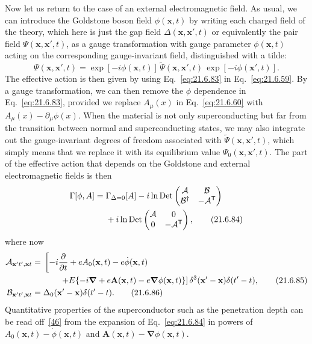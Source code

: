 Now let us return to the case of an external electromagnetic field. As usual, we can introduce the Goldstone boson field $\phi(\mathbf x,t)$ by writing each charged field of the theory, which here is just the gap field $\Delta(\mathbf x,\mathbf x',t)$ or equivalently the pair field $\Psi(\mathbf x,\mathbf x',t)$, as a gauge transformation with gauge parameter $\phi(\mathbf x,t)$ acting on the corresponding gauge-invariant field, distinguished with a tilde:
\begin{equation}
\Psi(\mathbf x,\mathbf x',t)
=\exp[-i\phi(\mathbf x,t)]\,
\widetilde\Psi(\mathbf x,\mathbf x',t)\,
\exp[-i\phi(\mathbf x',t)].
\tag{21.6.83}\label{eq:21.6.83}
\end{equation}
The effective action is then given by using Eq.~\eqref{eq:21.6.83} in Eq.~\eqref{eq:21.6.59}. By a gauge transformation, we can then remove the $\phi$ dependence in Eq.~\eqref{eq:21.6.83}, provided we replace $A_\mu(x)$ in Eq.~\eqref{eq:21.6.60} with $A_\mu(x)-\partial_\mu\phi(x)$. When the material is not only superconducting but far from the transition between normal and superconducting states, we may also integrate out the gauge-invariant degrees of freedom associated with $\widetilde\Psi(\mathbf x,\mathbf x',t)$, which simply means that we replace it with its equilibrium value $\Psi_0(\mathbf x,\mathbf x',t)$. The part of the effective action that depends on the Goldstone and external electromagnetic fields is then
\begin{align}
\Gamma[\phi,A]
={}&\Gamma_{\Delta=0}[A]
-i\ln\operatorname{Det}
\begin{pmatrix}
\mathcal A&\mathcal B\\
\mathcal B^\dagger&-\mathcal A^{\mathsf T}
\end{pmatrix}
\notag\\
&+i\ln\operatorname{Det}
\begin{pmatrix}
\mathcal A&0\\
0&-\mathcal A^{\mathsf T}
\end{pmatrix},
\tag{21.6.84}\label{eq:21.6.84}
\end{align}
where now
\begin{align}
\mathcal A_{\mathbf x't',\mathbf xt}
={}&\left[
-i\frac{\partial}{\partial t}
+eA_0(\mathbf x,t)-e\dot\phi(\mathbf x,t)
\right.
\notag\\
&\left.\qquad
+E\{-i\boldsymbol\nabla+e\mathbf A(\mathbf x,t)
-e\boldsymbol\nabla\phi(\mathbf x,t)\}
\right]
\delta^3(\mathbf x'-\mathbf x)\delta(t'-t),
\tag{21.6.85}\label{eq:21.6.85}\\
\mathcal B_{\mathbf x't',\mathbf xt}
={}&\Delta_0(\mathbf x'-\mathbf x)\delta(t'-t).
\tag{21.6.86}\label{eq:21.6.86}
\end{align}
Quantitative properties of the superconductor such as the penetration depth can be read off~\hyperref[ch21-ref-46]{[46]} from the expansion of Eq.~\eqref{eq:21.6.84} in powers of $A_0(\mathbf x,t)-\dot\phi(\mathbf x,t)$ and $\mathbf A(\mathbf x,t)-\boldsymbol\nabla\phi(\mathbf x,t)$.
